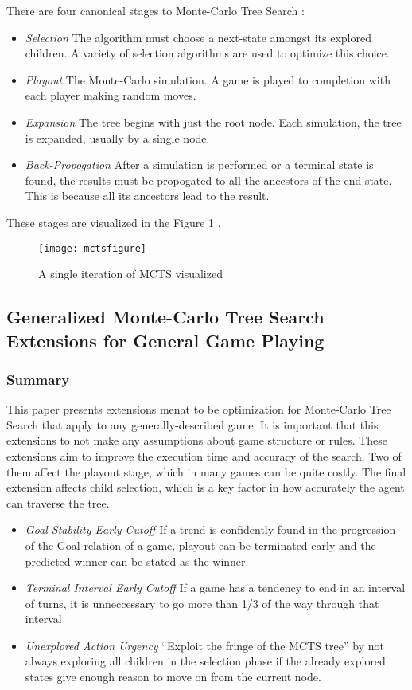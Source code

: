 \documentclass[letterpaper]{article}
\begin{document}
There are four canonical stages to Monte-Carlo Tree Search \cite{finnsson2012generalized}:
\begin{itemize}
\item \emph{Selection} The algorithm must choose a next-state amongst its explored children. A variety of selection algorithms are used to optimize this choice.
\item \emph{Playout} The Monte-Carlo simulation. A game is played to completion with each player making random moves.
\item \emph{Expansion} The tree begins with just the root node. Each simulation, the tree is expanded, usually by a single node.
\item \emph{Back-Propogation} After a simulation is performed or a terminal state is found, the results must be propogated to all the ancestors of the end state. This is because all its ancestors lead to the result.
\end{itemize}

These stages are visualized in the Figure 1 \cite{finnsson2012generalized}.

\begin{figure}[h]
\texttt{[image: mctsfigure]}
\centering
\caption{A single iteration of MCTS visualized}
\end{figure}

\subsection{Generalized Monte-Carlo Tree Search Extensions for General Game Playing}

\subsubsection{Summary}
This paper \cite{finnsson2012generalized} presents extensions menat to be optimization for Monte-Carlo Tree Search that apply to any generally-described game. It is important that this extensions to not make any assumptions about game structure or rules. These extensions aim to improve the execution time and accuracy of the search. Two of them affect the playout stage, which in many games can be quite costly. The final extension affects child selection, which is a key factor in how accurately the agent can traverse the tree.
\begin{itemize}
\item \emph{Goal Stability Early Cutoff} If a trend is confidently found in the progression of the Goal relation of a game, playout can be terminated early and the predicted winner can be stated as the winner.
\item \emph{Terminal Interval Early Cutoff} If a game has a tendency to end in an interval of turns, it is unneccessary to go more than 1/3 of the way through that interval \cite{finnbjorn}
\item \emph{Unexplored Action Urgency} ``Exploit the fringe of the MCTS tree'' by not always exploring all children in the selection phase if the already explored states give enough reason to move on from the current node.
\end{itemize}
\end{document}
